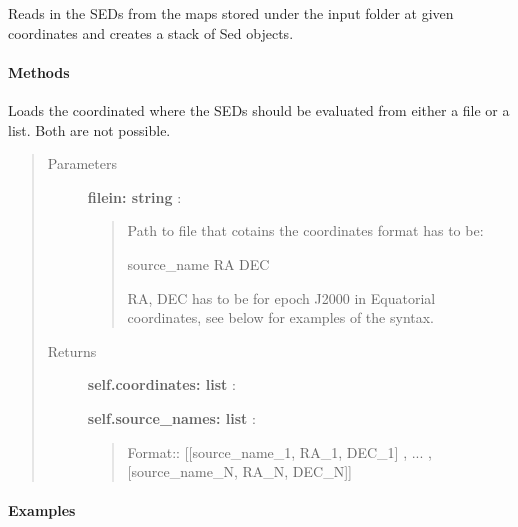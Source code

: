 \documentclass[a4paper,10pt,english]{sphinxmanual}
\begin{document}
\begin{fulllineitems}
\label{sed:astrolyze.sed.sed.SedStack}
Reads in the SEDs from the maps stored under the input folder at given
coordinates and creates a stack of Sed objects.
\paragraph{Methods}

\begin{fulllineitems}
\label{sed:astrolyze.sed.sed.SedStack.load_coordinates}
Loads the coordinated where the SEDs should be evaluated
from either a file or a list. Both are not possible.
\begin{quote}\begin{description}
\item[{Parameters }] \leavevmode
\textbf{filein: string} :
\begin{quote}

Path to file that cotains the coordinates format has to be:

source\_name RA DEC

RA, DEC has to be for epoch J2000 in Equatorial coordinates,
see below for examples of the syntax.
\end{quote}

\item[{Returns }] \leavevmode
\textbf{self.coordinates: list} :

\textbf{self.source\_names: list} :
\begin{quote}

Format::
{[}{[}source\_name\_1, RA\_1, DEC\_1{]} , ... , {[}source\_name\_N, RA\_N, DEC\_N{]}{]}
\end{quote}

\end{description}\end{quote}
\paragraph{Examples}


\end{fulllineitems}
\end{fulllineitems}
\end{document}
